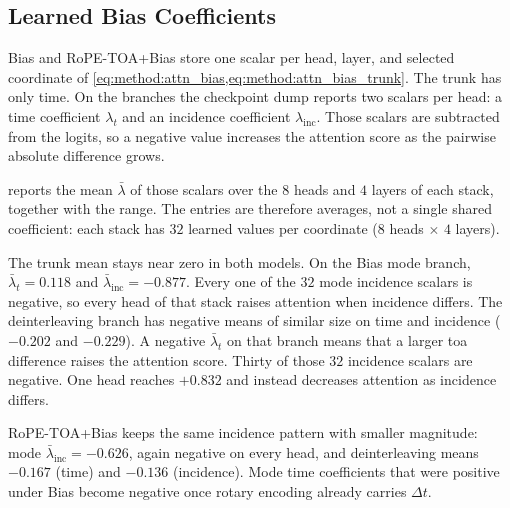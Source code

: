 \subsection{Learned Bias Coefficients}\label{sec:exp:results:bias_coef}

Bias and RoPE-TOA+Bias store one scalar per head, layer, and selected coordinate of \cref{eq:method:attn_bias,eq:method:attn_bias_trunk}.
The trunk has only time.
On the branches the checkpoint dump reports two scalars per head: a time coefficient $\lambda_t$ and an incidence coefficient $\lambda_{\mathrm{inc}}$.
Those scalars are subtracted from the logits, so a negative value increases the attention score as the pairwise absolute difference grows.

 reports the mean $\bar\lambda$ of those scalars over the $8$ heads and $4$ layers of each stack, together with the range.
The entries are therefore averages, not a single shared coefficient: each stack has $32$ learned values per coordinate ($8$ heads $\times$ $4$ layers).

The trunk mean stays near zero in both models.
On the Bias mode branch, $\bar\lambda_t = 0.118$ and $\bar\lambda_{\mathrm{inc}} = -0.877$.
Every one of the $32$ mode incidence scalars is negative, so every head of that stack raises attention when incidence differs.
The deinterleaving branch has negative means of similar size on time and incidence ($-0.202$ and $-0.229$).
A negative $\bar\lambda_t$ on that branch means that a larger \gls{toa} difference raises the attention score.
Thirty of those $32$ incidence scalars are negative. One head reaches $+0.832$ and instead decreases attention as incidence differs.

RoPE-TOA+Bias keeps the same incidence pattern with smaller magnitude: mode $\bar\lambda_{\mathrm{inc}} = -0.626$, again negative on every head, and deinterleaving means $-0.167$ (time) and $-0.136$ (incidence).
Mode time coefficients that were positive under Bias become negative once rotary encoding already carries $\Delta t$.

